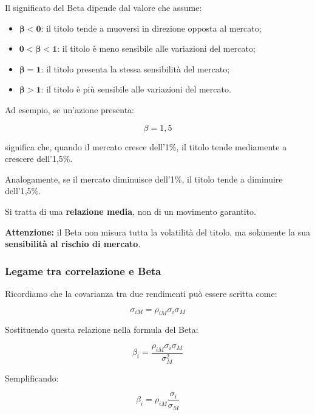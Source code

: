 \noindent Il significato del Beta dipende
dal valore che assume:

\begin{itemize}
    \item $\boldsymbol{\beta<0}$: il titolo tende
    a muoversi in direzione opposta al mercato;

    \item $\boldsymbol{0<\beta<1}$: il titolo
    è meno sensibile alle variazioni del mercato;

    \item $\boldsymbol{\beta=1}$: il titolo
    presenta la stessa sensibilità del mercato;

    \item $\boldsymbol{\beta>1}$: il titolo
    è più sensibile alle variazioni del mercato.
\end{itemize}

\noindent Ad esempio, se un'azione presenta:

\[
\boxed{\beta=1{,}5}
\]

\noindent significa che, quando il mercato cresce
dell'1\%, il titolo tende mediamente a crescere
dell'1,5\%.

\medskip

\noindent Analogamente, se il mercato diminuisce
dell'1\%, il titolo tende a diminuire dell'1,5\%.

\medskip

\noindent Si tratta di una \textbf{relazione media},
non di un movimento garantito.

\medskip

\noindent \textbf{Attenzione:} il Beta non misura
tutta la volatilità del titolo, ma solamente
la sua \textbf{sensibilità al rischio di mercato}.


\subsubsection*{Legame tra correlazione e Beta}

\noindent Ricordiamo che la covarianza tra
due rendimenti può essere scritta come:

\[
\sigma_{iM}=\rho_{iM}\sigma_i\sigma_M
\]

\noindent Sostituendo questa relazione
nella formula del Beta:

\[
\beta_i=
\frac{\rho_{iM}\sigma_i\sigma_M}{\sigma_M^2}
\]

\noindent Semplificando:

\[
\boxed{
\beta_i=\rho_{iM}\frac{\sigma_i}{\sigma_M}
}
\]


